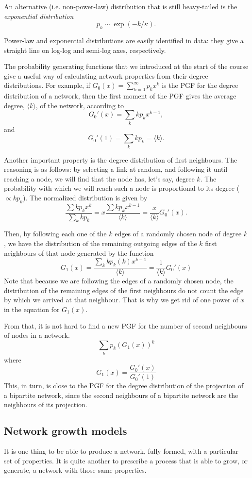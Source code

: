 An alternative (i.e. non-power-law) distribution that is still heavy-tailed is the \emph{exponential distribution}
$$
	p_k\sim\exp(-k/\kappa).
$$

Power-law and exponential distributions are easily identified in data: they give a straight line on log-log and semi-log axes, respectively.

The probability generating functions that we introduced at the start of the course give a useful way of calculating network properties from their degree distributions. For example, if $G_0(x) = \sum_{k=0}^\infty p_kx^k$ is the PGF for the degree distribution of a network, then the first moment of the PGF gives the average degree, $\langle k \rangle$, of the network, according to
$$
	G_{0}'(x) = \sum_{k}kp_{k}x^{k-1},
$$
and
$$
	G_{0}'(1) = \sum_{k}kp_{k} = \langle k \rangle.
$$	

Another important property is the degree distribution of first neighbours. The reasoning is as follows: by selecting a link at random, and following it until reaching a node, we will find that the node has, let's say, degree $k$. The probability with which we will reach such a node is proportional to its degree ($\propto kp_{k}$). The normalized distribution is given by
$$
	\dfrac{\sum kp_{k}x^{k}}{\sum_{k}kp_{k}} = x \dfrac{\sum kp_{k}x^{k-1}}{\langle k \rangle} = \dfrac{x}{\langle k \rangle}G_{0}'(x).
$$

Then, by following each one of the $k$ edges of a randomly chosen node of degree $k$, we have the distribution of the remaining outgoing edges of the $k$ first neighbours of that node generated by the function 
$$
	G_{1}(x) = \dfrac{\sum_{k}kp_{k}(k)x^{k-1}}{\langle k \rangle} = \dfrac{1}{\langle k \rangle}G_{0}'(x)
$$
Note that because we are following the edges of a randomly chosen node, the distribution of the remaining edges of the first neighbours do not count the edge by which we arrived at that neighbour. That is why we get rid of one power of $x$ in the equation for $G_{1}(x)$.

From that, it is not hard to find a new PGF for the number of second neighbours of nodes in a network. 
$$\sum_k p_k (G_1(x))^k $$ 
where 
$$G_1(x) = \frac{G_{0}'(x)}{G_{0}'(1)}$$ 
This, in turn, is close to the PGF for the degree distribution of the projection of a bipartite network, since the second neighbours of a bipartite network are the neighbours of its projection.

\subsection{Network growth models}
It is one thing to be able to produce a network, fully formed, with a particular set of properties. It is quite another to prescribe a process that is able to grow, or generate, a network with those same properties.

